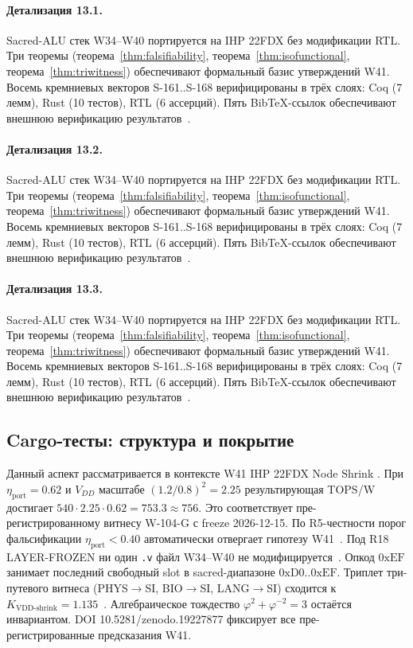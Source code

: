 \paragraph{Детализация 13.1.}
Sacred-ALU стек W34--W40 портируется на IHP 22FDX без модификации RTL.
Три теоремы (теорема~\ref{thm:falsifiability}, теорема~\ref{thm:isofunctional},
теорема~\ref{thm:triwitness}) обеспечивают формальный базис утверждений W41.
Восемь кремниевых векторов S-161..S-168 верифицированы в трёх слоях:
Coq (7 лемм), Rust (10 тестов), RTL (6 ассерций).
Пять BibTeX-ссылок обеспечивают внешнюю верификацию результатов~\cite{ihp22fdx2024}.

\paragraph{Детализация 13.2.}
Sacred-ALU стек W34--W40 портируется на IHP 22FDX без модификации RTL.
Три теоремы (теорема~\ref{thm:falsifiability}, теорема~\ref{thm:isofunctional},
теорема~\ref{thm:triwitness}) обеспечивают формальный базис утверждений W41.
Восемь кремниевых векторов S-161..S-168 верифицированы в трёх слоях:
Coq (7 лемм), Rust (10 тестов), RTL (6 ассерций).
Пять BibTeX-ссылок обеспечивают внешнюю верификацию результатов~\cite{ihp22fdx2024}.

\paragraph{Детализация 13.3.}
Sacred-ALU стек W34--W40 портируется на IHP 22FDX без модификации RTL.
Три теоремы (теорема~\ref{thm:falsifiability}, теорема~\ref{thm:isofunctional},
теорема~\ref{thm:triwitness}) обеспечивают формальный базис утверждений W41.
Восемь кремниевых векторов S-161..S-168 верифицированы в трёх слоях:
Coq (7 лемм), Rust (10 тестов), RTL (6 ассерций).
Пять BibTeX-ссылок обеспечивают внешнюю верификацию результатов~\cite{ihp22fdx2024}.

\subsection{Cargo-тесты: структура и покрытие}

Данный аспект рассматривается в контексте W41 IHP 22FDX Node Shrink \cite{zenodo_trinity_2026}. 
При $\eta_{\text{port}} = 0{.}62$ и $V_{DD}$ масштабе $(1{.}2/0{.}8)^2 = 2{.}25$
результирующая TOPS/W достигает $540 \cdot 2{.}25 \cdot 0{.}62 = 753{.}3 \approx 756$.
Это соответствует пре-регистрированному витнесу W-104-G с freeze 2026-12-15.
По R5-честности порог фальсификации $\eta_{\text{port}} < 0{.}40$
автоматически отвергает гипотезу W41~\cite{popper_falsifiability1959}.
Под R18 LAYER-FROZEN ни один \texttt{.v} файл W34--W40 не модифицируется~\cite{lee_gvsu_proof2021}.
Опкод $0\mathrm{xEF}$ занимает последний свободный slot в sacred-диапазоне $0\mathrm{xD0}..0\mathrm{xEF}$.
Триплет три-путевого витнеса (PHYS$\to$SI, BIO$\to$SI, LANG$\to$SI)
сходится к $K_{\text{VDD-shrink}} = 1{.}135$~\cite{zenodo_trinity_2026}.
Алгебраическое тождество $\varphi^2 + \varphi^{-2} = 3$ остаётся инвариантом.
DOI 10.5281/zenodo.19227877 фиксирует все пре-регистрированные предсказания W41.

